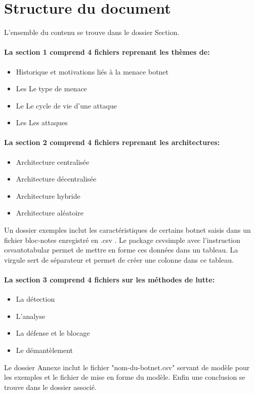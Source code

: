 \section*{Structure du document}
L'ensemble du contenu se trouve dans le dossier Section.
\paragraph {La section 1 comprend 4 fichiers reprenant les thèmes de:}
\begin{itemize}
	\item Historique et motivations liés à la menace botnet
  \item Les Le type de menace
  \item Le Le cycle de vie d'une attaque
  \item Les Les attaques 
\end{itemize}
\paragraph {La section 2 comprend 4 fichiers reprenant les architectures:}
\begin{itemize}
	\item Architecture centralisée
  \item Architecture décentralisée
  \item Architecture hybride
  \item Architecture aléatoire
\end{itemize}
Un dossier exemples inclut les caractéristiques de certains botnet saisis dans un fichier bloc-notes enregistré en .csv .
Le package csvsimple avec l'instruction csvautotabular permet de mettre en forme ces données dans un tableau.
La virgule sert de séparateur et permet de créer une colonne dans ce tableau.
\paragraph {La section 3 comprend 4 fichiers sur les méthodes de lutte:}
\begin{itemize}
	\item La détection
  \item L'analyse
	\item La défense et le blocage
  \item Le démantèlement
\end{itemize}
Le dossier Annexe inclut le fichier "nom-du-botnet.csv" servant de modèle pour les exemples et le fichier de mise en forme du modèle.
Enfin une conclusion se trouve dans le dossier associé.